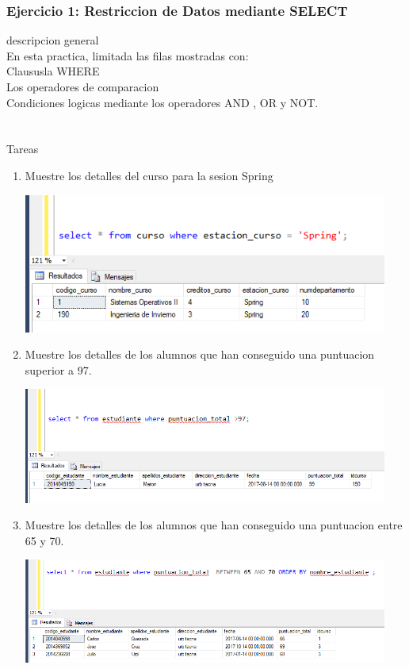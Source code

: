\documentclass[12pt,letterpaper]{article}
\begin{document}
\subsubsection{Ejercicio 1: Restriccion de Datos mediante SELECT} 
descripcion general  \\
En esta practica, limitada las filas mostradas con:\\
Claususla WHERE\\
Los operadores de comparacion\\
Condiciones logicas mediante los operadores AND , OR y NOT.\\
\\
\\Tareas
\begin{enumerate}[1.]
    \item Muestre los detalles del curso para la sesion Spring

\begin{center}
\includegraphics[width=12cm]{./IMAGENES/imagen1}
\end{center}

    
    \item Muestre los detalles de los alumnos que han conseguido una puntuacion superior a 97.
    
 
\begin{center}
\includegraphics[width=12cm]{./IMAGENES/imagen2}
\end{center}


    \item Muestre los detalles de los alumnos que han conseguido una puntuacion entre 65 y 70.

\begin{center}
\includegraphics[width=12cm]{./IMAGENES/imagen3}
\end{center}



\end{enumerate}
\end{document}
